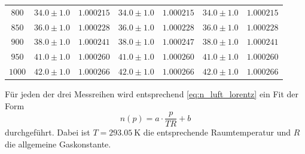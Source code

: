 \begin{table}
\begin{tabular}{c c c c c c c}
        $800 $ &    $34.0\pm1.0 $ & $ 1.000215$ & $ 34.0\pm1.0 $ & $	1.000215$ & $34.0\pm1.0 $ & $ 1.000215$ \\
        $850 $ &    $36.0\pm1.0 $ & $ 1.000228$ & $ 36.0\pm1.0 $ & $	1.000228$ & $36.0\pm1.0 $ & $ 1.000228$ \\
        $900 $ &    $38.0\pm1.0 $ & $ 1.000241$ & $ 38.0\pm1.0 $ & $	1.000247$ & $38.0\pm1.0 $ & $ 1.000241$ \\
        $950 $ &    $41.0\pm1.0 $ & $ 1.000260$ & $ 41.0\pm1.0 $ & $	1.000260$ & $41.0\pm1.0 $ & $ 1.000260$ \\
        $1000$ &	$42.0\pm1.0 $ & $ 1.000266$ & $ 42.0\pm1.0 $ & $	1.000266$ & $42.0\pm1.0 $ & $ 1.000266$ \\
        \bottomrule
    \end{tabular}
\end{table}
Für jeden der drei Messreihen wird entsprechend \autoref{eq:n_luft_lorentz} ein Fit der Form
\begin{equation*}
    n(p) = a \cdot \frac{p}{T R} + b 
\end{equation*}
durchgeführt.
Dabei ist $T = \qty{293.05}{\kelvin}$ die entsprechende Raumtemperatur und $R$ die allgemeine Gaskonstante.
